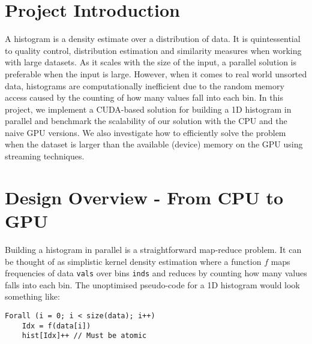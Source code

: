 \documentclass[12pt, a4paper, hidelinks]{article}
\renewcommand{\tt}[1]{\texttt{#1}}
\begin{document}

\tableofcontents
\newpage

\section{Project Introduction}
A histogram is a density estimate over a distribution of data.
It is quintessential to quality control, distribution estimation
and similarity measures when working with large datasets.
As it scales with the size of the input,
a parallel solution is preferable when the input is large.
However, when it comes to real world unsorted data,
histograms are computationally inefficient
due to the random memory access caused by
the counting of how many values fall into each bin.
In this project, we implement a CUDA-based solution for building a 1D histogram
in parallel and benchmark the scalability of our solution with
the CPU and the naive GPU versions.
We also investigate how to efficiently solve the problem when the dataset
is larger than the available (device) memory on the GPU
using streaming techniques.

\section{Design Overview - From CPU to GPU}
Building a histogram in parallel is a straightforward map-reduce problem.
It can be thought of as simplistic kernel density estimation
where a function $f$ maps frequencies of data \tt{vals} over bins \tt{inds}
and reduces by counting how many values falls into each bin.
The unoptimised pseudo-code for a 1D histogram
would look something like:

\begin{verbatim}
Forall (i = 0; i < size(data); i++)
    Idx = f(data[i])
    hist[Idx]++ // Must be atomic
\end{verbatim}
\end{document}

